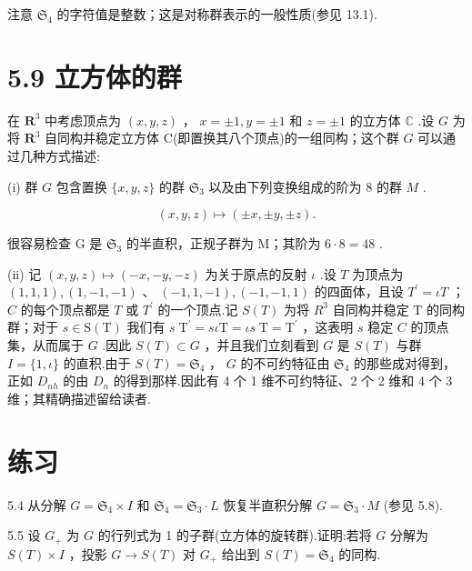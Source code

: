 \documentclass[10pt]{article}
\begin{document}
注意 \({\mathfrak{S}}_{4}\) 的字符值是整数；这是对称群表示的一般性质(参见 13.1).

\section*{5.9 立方体的群}

在 \({\mathbf{R}}^{3}\) 中考虑顶点为 \(\left( {x,y,z}\right)\) ， \(x =  \pm  1,y =  \pm  1\) 和 \(z =  \pm  1\) 的立方体 \(\mathbb{C}\) .设 \(G\) 为将 \({\mathbf{R}}^{3}\) 自同构并稳定立方体 C(即置换其八个顶点)的一组同构；这个群 \(G\) 可以通过几种方式描述:

(i) 群 \(G\) 包含置换 \(\{ x,y,z\}\) 的群 \({\mathfrak{S}}_{3}\) 以及由下列变换组成的阶为 8 的群 \(M\) .

\[
\left( {x,y,z}\right)  \mapsto  \left( {\pm x, \pm  y, \pm  z}\right) .
\]

很容易检查 \(\mathrm{G}\) 是 \({\mathfrak{S}}_{3}\) 的半直积，正规子群为 M；其阶为 \(6 \cdot  8 = {48}\) .

(ii) 记 \(\left( {x,y,z}\right)  \mapsto  \left( {-x, - y, - z}\right)\) 为关于原点的反射 \(\iota\) .设 \(T\) 为顶点为 \(\left( {1,1,1}\right) ,\left( {1, - 1, - 1}\right)\) 、 \(\left( {-1,1, - 1}\right) ,\left( {-1, - 1,1}\right)\) 的四面体，且设 \({T}^{\prime } = {\iota T}\) ； \(C\) 的每个顶点都是 \(T\) 或 \({T}^{\prime }\) 的一个顶点.记 \(S\left( T\right)\) 为将 \({R}^{3}\) 自同构并稳定 \(\mathrm{T}\) 的同构群；对于 \(s \in  \mathrm{S}\left( \mathrm{T}\right)\) 我们有 \(s{\mathrm{\;T}}^{\prime } = {s\iota }\mathrm{T} = {\iota s}\mathrm{\;T} = {\mathrm{T}}^{\prime }\) ，这表明 \(s\) 稳定 \(C\) 的顶点集，从而属于 \(G\) .因此 \(S\left( T\right)  \subset  G\) ，并且我们立刻看到 \(G\) 是 \(S\left( T\right)\) 与群 \(I = \{ 1,\iota \}\) 的直积.由于 \(S\left( T\right)  = {\mathfrak{S}}_{4}\) ， \(G\) 的不可约特征由 \({\mathfrak{S}}_{4}\) 的那些成对得到，正如 \({D}_{nh}\) 的由 \({D}_{n}\) 的得到那样.因此有 4 个 1 维不可约特征、2 个 2 维和 4 个 3 维；其精确描述留给读者.

\section*{练习}

5.4 从分解 \(G = {\mathfrak{S}}_{4} \times  I\) 和 \({\mathfrak{S}}_{4} = {\mathfrak{S}}_{3} \cdot  L\) 恢复半直积分解 \(G = {\mathfrak{S}}_{3} \cdot  M\) (参见 5.8).

5.5 设 \({G}_{ + }\) 为 \(G\) 的行列式为 1 的子群(立方体的旋转群).证明:若将 \(G\) 分解为 \(S\left( T\right)  \times  I\) ，投影 \(G \rightarrow  S\left( T\right)\) 对 \({G}_{ + }\) 给出到 \(S\left( T\right)  = {\mathfrak{S}}_{4}\) 的同构.
\end{document}
